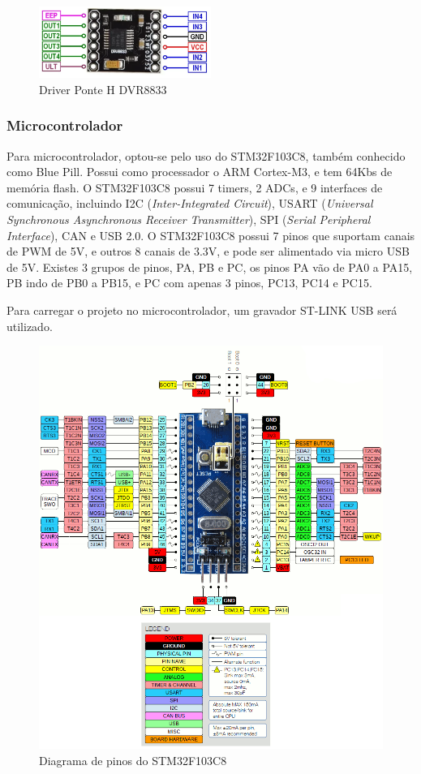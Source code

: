 \begin{figure}[htb]
	\centering
	\includegraphics[width=0.5\textwidth]{figures/DRV8833-Dual-Driver-Pinout}
	\caption{Driver Ponte H DVR8833 \cite{DRV8833_image}}
\end{figure}

\subsubsection{Microcontrolador}

Para microcontrolador, optou-se pelo uso do  STM32F103C8, também conhecido como Blue Pill.
Possui como processador o ARM Cortex-M3, e tem 64Kbs de memória flash. 
O STM32F103C8 possui 7 timers, 2 ADCs, e 9 interfaces de comunicação, incluindo
I2C (\textit{Inter-Integrated Circuit}), USART (\textit{Universal Synchronous
Asynchronous Receiver Transmitter}), SPI (\textit{Serial Peripheral Interface}),
CAN e USB 2.0.
O STM32F103C8 possui 7 pinos que suportam canais de PWM de 5V, e outros 8 canais de 3.3V,  e pode ser alimentado via micro
USB de 5V. Existes 3 grupos de pinos, PA, PB e PC,  os pinos PA vão de PA0 a PA15, PB indo de PB0 a PB15, e PC com apenas 3 pinos, PC13, PC14 e PC15.

Para carregar o projeto no microcontrolador, um gravador ST-LINK USB será utilizado.

\begin{figure}[htb]
	\centering
	\includegraphics[width=1.0\textwidth]{figures/stm32f1_pinout}
	\caption{Diagrama de pinos do STM32F103C8}
\end{figure}

